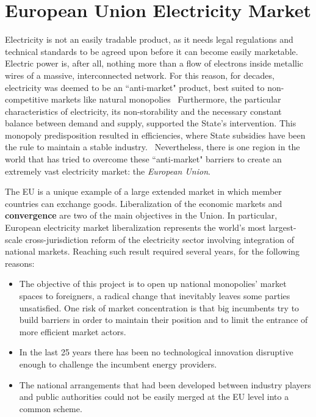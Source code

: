 \documentclass[a4paper,12pt]{book}
\begin{document}
\section{European Union Electricity Market}

Electricity is not an easily tradable product, as it needs legal regulations and technical standards to be agreed upon before it can become easily marketable. Electric power is, after all, nothing more than a flow of electrons inside metallic wires of a massive, interconnected network. For this reason, for decades, electricity was deemed to be an ``anti-market" product, best suited to non-competitive markets like natural monopolies~\cite{glachant2014eu} Furthermore, the particular characteristics of electricity, its non-storability and the necessary constant balance between demand and supply, supported the State's intervention. This monopoly predisposition resulted in efficiencies, where State subsidies have been the rule to maintain a stable industry.~\cite{domanico2007concentration} Nevertheless, there is one region in the world that has tried to overcome these ``anti-market" barriers to create an extremely vast electricity market: the \textit{European Union}.

The EU is a unique example of a large extended market in which member countries can exchange goods. Liberalization of the economic markets and \textbf{convergence} are two of the main objectives in the Union. In particular, European electricity market liberalization represents the world's most largest-scale cross-jurisdiction reform of the electricity sector involving integration of national markets. Reaching such result required several years, for the following reasons:

\begin{itemize}

\item The objective of this project is to open up national monopolies’ market spaces to foreigners, a radical change that inevitably leaves some parties unsatisfied.  One risk of market concentration is that big incumbents try to build barriers in order to maintain their position and to limit the entrance of more efficient market actors.~\cite{ringel2003liberalising}

\item In the last 25 years there has been no technological innovation disruptive enough to challenge the incumbent energy
providers.

\item The national arrangements that had been developed between industry players and public authorities could not be easily merged at the EU level into a common scheme.
\end{itemize}
\end{document}
